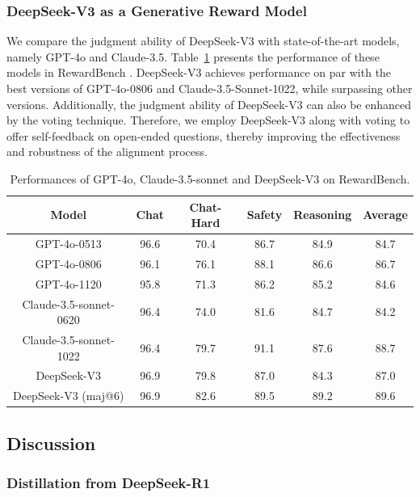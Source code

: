 \documentclass[11pt, a4paper, logo, copyright, nonumbering]{deepseek}
\newcommand{\dsviii}{DeepSeek-V3}
\begin{document}
\begin{CJK*}{UTF8}{gbsn}
\subsubsection{\dsviii{} as a Generative Reward Model}

We compare the judgment ability of \dsviii{} with state-of-the-art models, namely GPT-4o and Claude-3.5. 
Table~\ref{tab:rewardbench} presents the performance of these models in RewardBench \citep{lambert2024rewardbench}.
\dsviii{} achieves performance on par with the best versions of GPT-4o-0806 and Claude-3.5-Sonnet-1022, while surpassing other versions. 
Additionally, the judgment ability of \dsviii{} can also be enhanced by the voting technique. 
Therefore, we employ \dsviii{} along with voting to offer self-feedback on open-ended questions, thereby improving the effectiveness and robustness of the alignment process.

\begin{table}[t]
    \centering
    \begin{tabular}{c | c c c c c}
    \toprule
    \textbf{Model} & \textbf{Chat} & \textbf{Chat-Hard} & \textbf{Safety} & \textbf{Reasoning} & \textbf{Average} \\
    \midrule
    GPT-4o-0513 & 96.6 & 70.4 & 86.7 & 84.9 & 84.7\\
    GPT-4o-0806 & 96.1 & 76.1 & 88.1 & 86.6 & 86.7\\
    GPT-4o-1120 & 95.8 & 71.3 & 86.2 & 85.2 & 84.6\\
    \midrule 
    Claude-3.5-sonnet-0620 & 96.4 & 74.0 & 81.6 & 84.7 & 84.2\\
    Claude-3.5-sonnet-1022 & 96.4 & 79.7 & 91.1 & 87.6 & 88.7\\
    \midrule 
    \dsviii{} & 96.9 & 79.8 & 87.0 & 84.3 & 87.0\\
    \dsviii{} (maj@6) & 96.9 & 82.6 & 89.5 & 89.2 & 89.6\\
    \bottomrule
    \end{tabular}
    \caption{Performances of GPT-4o, Claude-3.5-sonnet and \dsviii{} on RewardBench.}
    \label{tab:rewardbench} 
\end{table}

\subsection{Discussion}

\subsubsection{Distillation from DeepSeek-R1} 


\end{CJK*}
\end{document}
